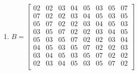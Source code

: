 \begin{enumerate}
  \item
 $ B = \begin{bmatrix}
    02 & 02 & 03 & 04 & 05 & 03 & 05 & 07 \\
    07 & 02 & 02 & 03 & 04 & 05 & 03 & 05 \\
    05 & 07 & 02 & 02 & 03 & 04 & 05 & 03 \\
    03 & 05 & 07 & 02 & 02 & 03 & 04 & 05 \\
    05 & 03 & 05 & 07 & 02 & 02 & 03 & 04 \\
    04 & 05 & 03 & 05 & 07 & 02 & 02 & 03 \\
    03 & 04 & 05 & 03 & 05 & 07 & 02 & 02 \\
    02 & 03 & 04 & 05 & 03 & 05 & 07 & 02 \\
  \end{bmatrix}$

\end{enumerate}
